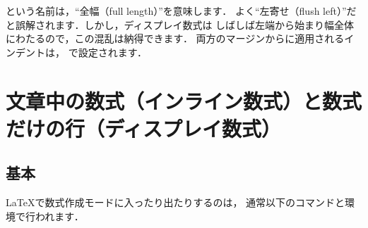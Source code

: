 \begin{table}[p]
\begin{makeimage}
\begin{minipage}{\textwidth}
\begin{notes}
\item {}という名前は，``全幅（full length）''を意味します．
よく``左寄せ（flush left）''だと誤解されます．しかし，ディスプレイ数式は
しばしば左端から始まり幅全体にわたるので，この混乱は納得できます．
両方のマージンからに適用されるインデントは，
で設定されます．
\end{notes}
\end{minipage}
\end{makeimage}
\end{table}


\section{文章中の数式（インライン数式）と数式だけの行（ディスプレイ数式）}\label{first-step}

\subsection{基本}

\LaTeX{}で数式作成モードに入ったり出たりするのは，
通常以下のコマンドと環境で行われます．

